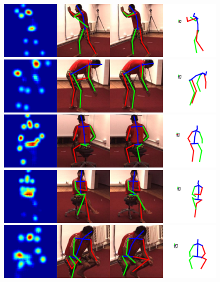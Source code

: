 \begin{figure}
  \centering
  \begin{minipage}{0.49\textwidth}
  \includegraphics[width=\linewidth]{figures/examples/h36m/S9-1.pdf}\vspace{0.3em}
  \includegraphics[width=\linewidth]{figures/examples/h36m/S9-2.pdf}\vspace{0.3em}
  \includegraphics[width=\linewidth]{figures/examples/h36m/S9-3.pdf}\vspace{0.3em}
  \includegraphics[width=\linewidth]{figures/examples/h36m/S9-5.pdf}\vspace{0.3em}
  \includegraphics[width=\linewidth]{figures/examples/h36m/S9-6.pdf}\vspace{0.3em}

\end{minipage}
\end{figure}
